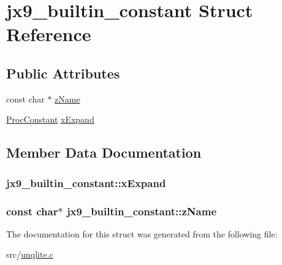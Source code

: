 \hypertarget{structjx9__builtin__constant}{\section{jx9\-\_\-builtin\-\_\-constant Struct Reference}
\label{d2/d40/structjx9__builtin__constant}
}
\subsection*{Public Attributes}
\begin{DoxyCompactItemize}
\item 
const char $\ast$ \hyperlink{structjx9__builtin__constant_ac8b5dbaeccdddafd17b6c34ac7dce89f}{z\-Name}
\item 
\hyperlink{unqlite_8c_a36597dc510fe171854fecbf97587814e}{Proc\-Constant} \hyperlink{structjx9__builtin__constant_a15e3727eeebe67c5a62cb35b09ef7a72}{x\-Expand}
\end{DoxyCompactItemize}


\subsection{Member Data Documentation}
\hypertarget{structjx9__builtin__constant_a15e3727eeebe67c5a62cb35b09ef7a72}{
\subsubsection[{x\-Expand}]{ jx9\-\_\-builtin\-\_\-constant\-::x\-Expand}}\label{d2/d40/structjx9__builtin__constant_a15e3727eeebe67c5a62cb35b09ef7a72}
\hypertarget{structjx9__builtin__constant_ac8b5dbaeccdddafd17b6c34ac7dce89f}{
\subsubsection[{z\-Name}]{\setlength{\rightskip}{0pt plus 5cm}const char$\ast$ jx9\-\_\-builtin\-\_\-constant\-::z\-Name}}\label{d2/d40/structjx9__builtin__constant_ac8b5dbaeccdddafd17b6c34ac7dce89f}


The documentation for this struct was generated from the following file\-:\begin{DoxyCompactItemize}
\item 
src/\hyperlink{unqlite_8c}{unqlite.\-c}\end{DoxyCompactItemize}
